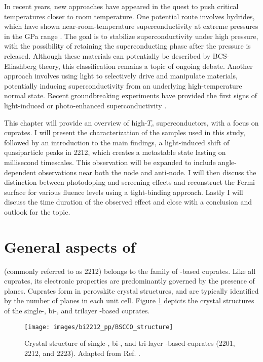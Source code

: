 In recent years, new approaches have appeared in the quest to push critical temperatures closer to room temperature.
One potential route involves hydrides, which have shown near-room-temperature superconductivity at extreme pressures in the \unit{\giga\pascal} range \cite{duan_structure_2017}.
The goal is to stabilize superconductivity under high pressure, with the possibility of retaining the superconducting phase after the pressure is released.
Although these materials can potentially be described by BCS-Eliashberg theory, this classification remains a topic of ongoing debate.
Another approach involves using light to selectively drive and manipulate materials, potentially inducing superconductivity from an underlying high-temperature normal state.
Recent groundbreaking experiments have provided the first signs of light-induced or photo-enhanced superconductivity \cite{fausti_light-induced_2011, buzzi_phase_2021, fava_magnetic_2024}.

This chapter will provide an overview of high-$T_c$ superconductors, with a focus on cuprates.
I will present the characterization of the samples used in this study, followed by an introduction to the main findings, a light-induced shift of quasiparticle peaks in 2212, which creates a metastable state lasting on millisecond timescales.
This observation will be expanded to include angle-dependent observations near both the node and anti-node.
I will then discuss the distinction between photodoping and screening effects and reconstruct the Fermi surface for various fluence levels using a tight-binding approach.
Lastly I will discuss the time duration of the observed effect and close with a conclusion and outlook for the topic.

\section{General aspects of }
\label{sec:bscco_general}

 (commonly referred to as 2212) belongs to the family of -based cuprates.
Like all cuprates, its electronic properties are predominantly governed by the presence of  planes.
Cuprates form in perovskite crystal structures, and are typically identified by the number of  planes in each unit cell.
Figure \ref{fig:bscco_structure} depicts the crystal structures of the single-, bi-, and trilayer -based cuprates.

\begin{figure}
	\centering
	\texttt{[image: images/bi2212\_pp/BSCCO\_structure]}
	\caption{Crystal structure of single-, bi-, and tri-layer -based cuprates  (2201, 2212, and 2223). Adapted from Ref. \cite{nazargulov_english_2009}.}
	\label{fig:bscco_structure}
\end{figure}

